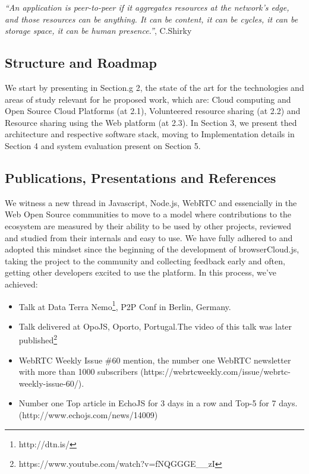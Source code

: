   \textit{``An application is peer-to-peer if it aggregates resources at the network’s edge, and those resources can be anything. It can be content, it can be cycles, it can be storage space, it can be human presence.''}, C.Shirky \cite{Shirky.}

\subsection{Structure and Roadmap}

We start by presenting in Section.g 2, the state of the art for the technologies and areas of study relevant for he proposed work, which are: Cloud computing and Open Source Cloud Platforms (at 2.1), Volunteered resource sharing (at 2.2) and Resource sharing using the Web platform (at 2.3). In Section 3, we present thed architecture and respective software stack, moving to Implementation details in Section 4 and system evaluation present on Section 5.

\subsection{Publications, Presentations and References}

We witness a new thread in Javascript, Node.js, WebRTC and essencially in the Web Open Source communities to move to a model where contributions to the ecosystem are measured by their ability to be used by other projects, reviewed and studied from their internals and easy to use. We have fully adhered to and adopted this mindset since the beginning of the development of browserCloud.js, taking the project to the community and collecting feedback early and often, getting other developers excited to use the platform. In this process, we've achieved:

\begin{itemize}
  \item Talk at Data Terra Nemo\footnote{http://dtn.is/}, P2P Conf in Berlin, Germany. 
    \item Talk delivered at OpoJS, Oporto, Portugal.The video of this talk was later published\footnote{https://www.youtube.com/watch?v=fNQGGGE\_\_zI}
    \item WebRTC Weekly Issue \#60 mention, the number one WebRTC newsletter with more than 1000 subscribers (https://webrtcweekly.com/issue/webrtc-weekly-issue-60/).
    \item Number one Top article in EchoJS for 3 days in a row and Top-5 for 7 days. (http://www.echojs.com/news/14009)
\end{itemize}
